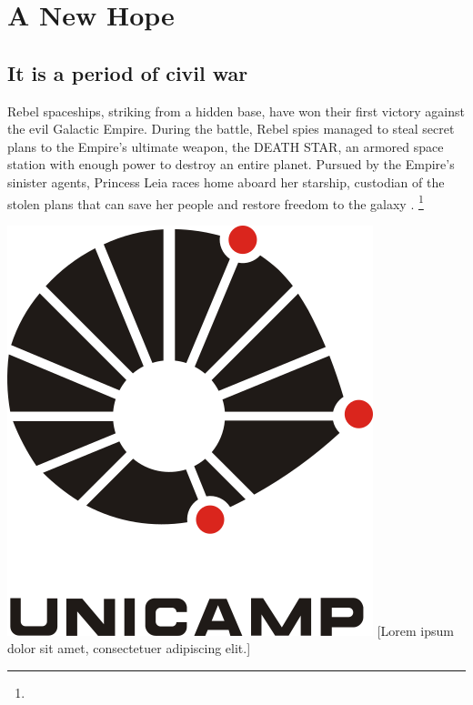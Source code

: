 \chapter{A New Hope}
\section{It is a period of civil war}
Rebel spaceships, striking from a hidden base, have won 
their first victory against the evil Galactic Empire.  
During the battle, Rebel spies managed to steal secret 
plans to the Empire's ultimate weapon, the DEATH STAR, 
an armored space station with enough power to destroy 
an entire planet. Pursued by the Empire's sinister 
agents, Princess Leia races home aboard her starship, 
custodian of the stolen plans that can save her people 
and restore freedom to the galaxy \cite{bib_skywalker77, bib_vader77, bib_kenobi77}.
\footnote{\lipsum[1]}

\lipsum[1-3]

\begin{center}
\includegraphics[width=.35\textwidth]{Images/unicamp.png}
[Lorem ipsum dolor sit amet, consectetuer adipiscing elit.]{\lipsum[1]}
\end{center}

\lipsum[1-3]

\begin{longcitation}
\lipsum[1]
\end{longcitation}

\lipsum[4-10]

